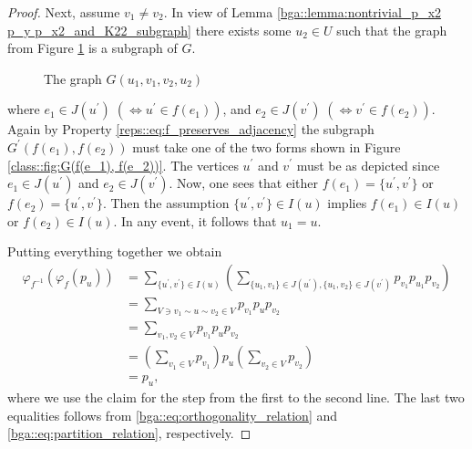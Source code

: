 \documentclass[a4paper]{amsart}
\begin{document}
\begin{proof}
    Next, assume $v_1 \neq v_2$. In view of Lemma \ref{bga::lemma:nontrivial_p_x2 p_y p_x2_and_K22_subgraph} there exists some $u_2 \in U$ such that the graph from Figure \ref{class::fig:G(u_1, v_1, v_2, u_2)} is a subgraph of $G$. %
%
    \begin{figure}[htb]
        \caption{The graph $G(u_1, v_1, v_2, u_2)$}
        \label{class::fig:G(u_1, v_1, v_2, u_2)}
    \end{figure}
%  
    where $e_1 \in J(u^\prime)\; ( \Leftrightarrow u^\prime \in f(e_1))$, and $e_2 \in J(v^\prime)\; ( \Leftrightarrow v^\prime \in f(e_2))$.
    Again by Property \eqref{reps::eq:f_preserves_adjacency} the subgraph $G^\prime(f(e_1), f(e_2))$ must take one of the two forms shown in Figure \ref{class::fig:G(f(e_1), f(e_2))}. The vertices $u^\prime$ and $v^\prime$ must be as depicted since $e_1 \in J(u^\prime)$ and $e_2 \in J(v^\prime)$. Now, one sees that either $f(e_1) = \{u^\prime, v^\prime\}$ or $f(e_2) = \{u^\prime, v^\prime\}$. Then the assumption $\{u^\prime, v^\prime\} \in I(u)$ implies $f(e_1) \in I(u)$ or $f(e_2) \in I(u)$. In any event, it follows that $u_1 = u$.

    Putting everything together we obtain
    \begin{align*}
        \varphi_{f^{-1}}(\varphi_f(p_u))
            &= \sum_{\{u^\prime, v^\prime\} \in I(u)} \left( \sum_{\{u_1, v_1\} \in J(u^\prime), \{u_1, v_2\} \in J(v^\prime)} p_{v_1} p_{u_1} p_{v_2} \right) \\
            &= \sum_{V \ni v_1 \sim u \sim v_2 \in V} p_{v_1} p_u p_{v_2} \\
            &= \sum_{v_1, v_2 \in V} p_{v_1} p_u p_{v_2} \\
            &= \left( \sum_{v_1 \in V} p_{v_1} \right) p_u \left( \sum_{v_2 \in V} p_{v_2} \right) \\
            &= p_u,
    \end{align*}
    where we use the claim for the step from the first to the second line. The last two equalities follows from \eqref{bga::eq:orthogonality_relation} and \eqref{bga::eq:partition_relation}, respectively.
\end{proof}
\end{document}
